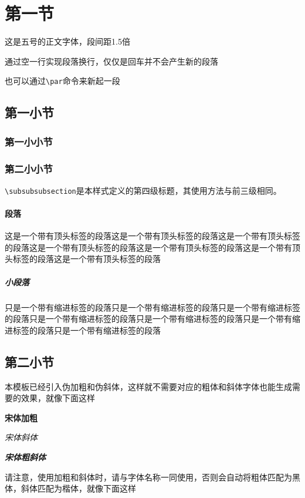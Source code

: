 \documentclass[supercite]{HustGraduTrans}
\begin{document}
    \section{第一节}
    这是五号的正文字体，段间距1.5倍
    
    通过空一行实现段落换行，仅仅是回车并不会产生新的段落
    \par 也可以通过\verb|\par|命令来新起一段
    \subsection{第一小节}
    \subsubsection{第一小小节}
    \subsubsection{第二小小节}
    \label{subsubsubsec:subsubsubsec}
    
    \verb|\subsubsubsection|是本样式定义的第四级标题，其使用方法与前三级相同。
    
    \paragraph{段落}\label{para:para}这是一个带有顶头标签的段落这是一个带有顶头标签的段落这是一个带有顶头标签的段落这是一个带有顶头标签的段落这是一个带有顶头标签的段落这是一个带有顶头标签的段落这是一个带有顶头标签的段落
    \subparagraph{小段落}\label{subpara:subpara}只是一个带有缩进标签的段落只是一个带有缩进标签的段落只是一个带有缩进标签的段落只是一个带有缩进标签的段落只是一个带有缩进标签的段落只是一个带有缩进标签的段落只是一个带有缩进标签的段落
    \subsection{第二小节}
    本模板已经引入伪加粗和伪斜体，这样就不需要对应的粗体和斜体字体也能生成需要的效果，就像下面这样
    
    {\songti \bfseries 宋体加粗}
    
    {\songti \itshape 宋体斜体}
    
    {\songti \bfseries \itshape 宋体粗斜体}
    
    请注意，使用加粗和斜体时，请与字体名称一同使用，否则会自动将粗体匹配为黑体，斜体匹配为楷体，就像下面这样
    
\end{document}
